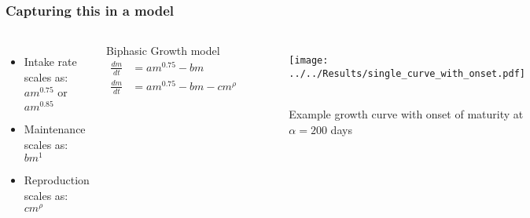 \documentclass[handout]{beamer}
\begin{document}
\begin{frame}
	\frametitle{Capturing this in a model}
	\begin{columns}[b]
		\begin{itemize}
			\item Intake rate scales as: $am^{0.75}$ or $am^{0.85}$
			\item Maintenance scales as: $bm^{1}$
			\item Reproduction scales as: $cm^{\rho}$
		\end{itemize}
		\begin{block}{Biphasic Growth model}
			\begin{align*}
				\frac{dm}{dt} &= am^{0.75} - bm \\ %
				\frac{dm}{dt} &= am^{0.75} - bm - cm^{\rho} %
			\end{align*}
		\end{block}
		\centering
		\begin{figure}
			\texttt{[image: ../../Results/single\_curve\_with\_onset.pdf]}   \
			\caption{Example growth curve with onset of maturity at $\alpha = 200$ days}
		\end{figure}
	\end{columns}
\end{frame}
\end{document}

